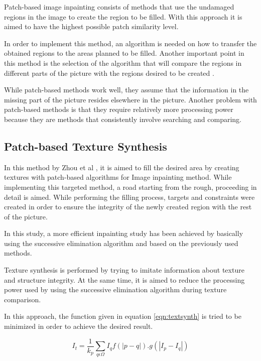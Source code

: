 Patch-based image inpainting consists of methods that use the undamaged regions in the image to create the region to be filled. With this approach it is aimed to have the highest possible patch similarity level\cite{inpaintingoverview}.

In order to implement this method, an algorithm is needed on how to transfer the obtained regions to the areas planned to be filled. Another important point in this method is the selection of the algorithm that will compare the regions in different parts of the picture with the regions desired to be created \cite{patchmatch}.

While patch-based methods work well, they assume that the information in the missing part of the picture resides elsewhere in the picture. Another problem with patch-based methods is that they require relatively more processing power because they are methods that consistently involve searching and comparing.

\subsection{Patch-based Texture Synthesis}

In this method by Zhou et al \cite{patch_based_tex_synthesis}, it is aimed to fill the desired area by creating textures with patch-based algorithms for Image inpainting method. While implementing this targeted method, a road starting from the rough, proceeding in detail is aimed. While performing the filling process, targets and constraints were created in order to ensure the integrity of the newly created region with the rest of the picture.

In this study, a more efficient inpainting study has been achieved by basically using the successive elimination algorithm and based on the previously used methods.

Texture synthesis is performed by trying to imitate information about texture and structure integrity. At the same time, it is aimed to reduce the processing power used by using the successive elimination algorithm during texture comparison.

In this approach, the function given in equation \ref{eqn:textsynth} is tried to be minimized in order to achieve the desired result.

\begin{equation}
    \label{eqn:textsynth}
    I_t = \frac{1}{k_p} \displaystyle\sum\limits_{q\epsilon\Omega} {I_qf(|p-q|).g(|I_p-I_q|)}
\end{equation}

